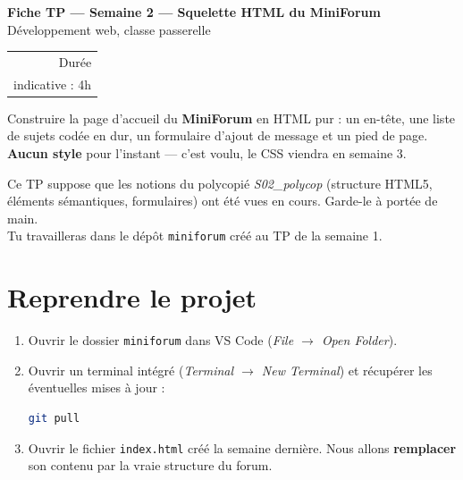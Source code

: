 \documentclass[a4paper,11pt]{article}
\begin{document}

\begin{tcolorbox}[
  colback=accentBlue, colframe=accentBlue,
  arc=4pt, left=12pt, right=12pt, top=10pt, bottom=10pt]
  \begin{minipage}{0.72\linewidth}
    {\color{white}\Large\bfseries Fiche TP --- Semaine 2 --- Squelette HTML du MiniForum}\\[4pt]
    {\color{lightBlue}\normalsize Développement web, classe passerelle}
  \end{minipage}
  \hfill
  \begin{minipage}{0.22\linewidth}
    \raggedleft
    \begin{tabular}{r}
      \color{lightBlue}\small Durée \\
      \color{white}\small indicative : 4h \\
    \end{tabular}
  \end{minipage}
\end{tcolorbox}

\vspace{6pt}
\begin{tcolorbox}[definition, title={Objectif du TP}]
Construire la page d'accueil du \textbf{MiniForum} en HTML pur : un en-tête, une liste de sujets codée en dur, un formulaire d'ajout de message et un pied de page. \textbf{Aucun style} pour l'instant --- c'est voulu, le CSS viendra en semaine 3.
\end{tcolorbox}

\begin{tcolorbox}[astuce, title={Avant de commencer}]
Ce TP suppose que les notions du polycopié \textit{S02\_polycop} (structure HTML5, éléments sémantiques, formulaires) ont été vues en cours. Garde-le à portée de main.\\
Tu travailleras dans le dépôt \texttt{miniforum} créé au TP de la semaine 1.
\end{tcolorbox}

\section{Reprendre le projet}

\begin{enumerate}
  \item Ouvrir le dossier \texttt{miniforum} dans VS Code (\textit{File $\rightarrow$ Open Folder}).
  \item Ouvrir un terminal intégré (\textit{Terminal $\rightarrow$ New Terminal}) et récupérer les éventuelles mises à jour :
\begin{lstlisting}[language=bash]
git pull
\end{lstlisting}
  \item Ouvrir le fichier \texttt{index.html} créé la semaine dernière. Nous allons \textbf{remplacer} son contenu par la vraie structure du forum.
\end{enumerate}
\end{document}
